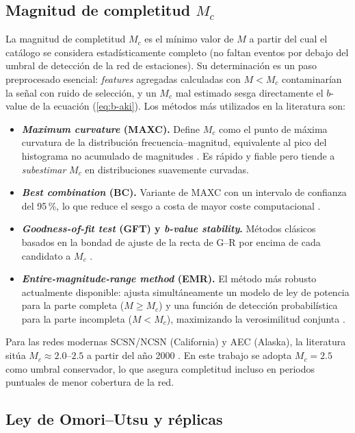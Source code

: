 \subsection{Magnitud de completitud \texorpdfstring{$M_c$}{Mc}}
\label{mc}

La magnitud de completitud $M_c$ es el mínimo valor de $M$ a partir del cual el catálogo se considera estadísticamente completo (no faltan eventos por debajo del umbral de detección de la red de estaciones). Su determinación es un paso preprocesado esencial: \textit{features} agregadas calculadas con $M < M_c$ contaminarían la señal con ruido de selección, y un $M_c$ mal estimado sesga directamente el $b$-value de la ecuación (\ref{eq:b-aki}). Los métodos más utilizados en la literatura son:

\begin{itemize}
  \item \textbf{\textit{Maximum curvature} (MAXC).} Define $M_c$ como el punto de máxima curvatura de la distribución frecuencia--magnitud, equivalente al pico del histograma no acumulado de magnitudes \citep{wiemer2000mc}. Es rápido y fiable pero tiende a \emph{subestimar} $M_c$ en distribuciones suavemente curvadas.
  \item \textbf{\textit{Best combination} (BC).} Variante de MAXC con un intervalo de confianza del 95\,\%, lo que reduce el sesgo a costa de mayor coste computacional \citep{wiemer2000mc}.
  \item \textbf{\textit{Goodness-of-fit test} (GFT) y \textit{b-value stability}.} Métodos clásicos basados en la bondad de ajuste de la recta de G--R por encima de cada candidato a $M_c$ \citep{mignan2012mc}.
  \item \textbf{\textit{Entire-magnitude-range method} (EMR).} El método más robusto actualmente disponible: ajusta simultáneamente un modelo de ley de potencia para la parte completa ($M \geq M_c$) y una función de detección probabilística para la parte incompleta ($M < M_c$), maximizando la verosimilitud conjunta \citep{woessner2005assessing}.
\end{itemize}

Para las redes modernas SCSN/NCSN (California) y AEC (Alaska), la literatura sitúa $M_c \approx 2.0$--$2.5$ a partir del año 2000 \citep{wiemer2000mc}. En este trabajo se adopta $M_c = 2.5$ como umbral conservador, lo que asegura completitud incluso en periodos puntuales de menor cobertura de la red.

\subsection{Ley de Omori--Utsu y réplicas}
\label{omori}

